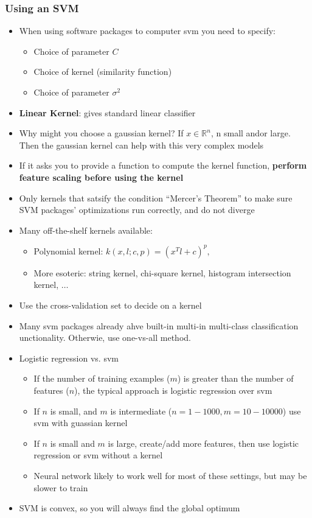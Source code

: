 \subsubsection{Using an SVM}
\begin{itemize}[--]
	\item When using software packages to computer svm you need to specify:
	\begin{itemize}[--]
		\item Choice of parameter $C$
		\item Choice of kernel (similarity function)
		\item Choice of parameter $\sigma^2$
	\end{itemize}

	\item \textbf{Linear Kernel}: gives standard linear classifier
	\item Why might you choose a gaussian kernel? If $x\in\mathbb{R}^n$, n small andor large. Then the gaussian kernel can help with this very complex models
	\item If it asks you to provide a function to compute the kernel function, \textbf{perform feature scaling before using the kernel}
	\item Only kernels that satsify the condition ``Mercer's Theorem'' to make sure SVM packages' optimizations run correctly, and do not diverge
	\item Many off-the-shelf kernels available:
	\begin{itemize}[--]
		\item Polynomial kernel: $k(x,l;c,p)=(x^T l+c)^p,$
		\item More esoteric: string kernel, chi-square kernel, histogram intersection kernel, $\ldots$
	\end{itemize}

	\item Use the cross-validation set to decide on a kernel

	\item Many svm packages already ahve built-in multi-in multi-class classification unctionality. Otherwie, use one-vs-all method.

	\item Logistic regression vs. svm
	\begin{itemize}[--]
		\item If the number of training examples ($m$) is greater than the number of features ($n$), the typical approach is logistic regression over svm 
		\item If $n$ is small, and $m$ is intermediate ($n=1-1000,m=10-10000$) use svm with guassian kernel
		\item If $n$ is small and $m$ is large, create/add more features, then use logistic regression or svm without a kernel
		\item Neural network likely to work well for most of these settings, but may be slower to train
	\end{itemize}

	\item SVM is convex, so you will always find the global optimum
\end{itemize}
